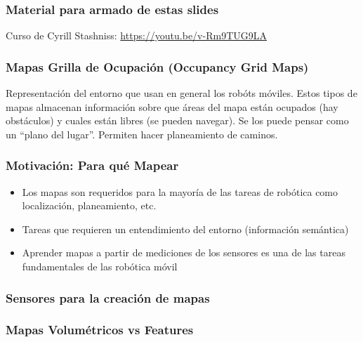 \begin{frame}
	\frametitle{Material para armado de estas slides}
	Curso de Cyrill Stashniss: \url{https://youtu.be/v-Rm9TUG9LA}

\end{frame}

\begin{frame}
    \frametitle{Mapas Grilla de Ocupación (Occupancy Grid Maps)}
    
    Representación del entorno que usan en general los robóts móviles.
    Estos tipos de mapas almacenan información sobre que áreas del mapa están ocupados (hay obstáculos) y cuales están libres (se pueden navegar). Se los puede pensar como un ``plano del lugar''.
    Permiten hacer planeamiento de caminos.
    
    
\end{frame}

\begin{frame}
    \frametitle{Motivación: Para qué Mapear}
    
    \begin{itemize}
        \item Los mapas son requeridos para la mayoría de las tareas de robótica como localización, planeamiento, etc.
        \item Tareas que requieren un entendimiento del entorno (información semántica)
        \item Aprender mapas a partir de mediciones de los sensores es una de las tareas fundamentales de las robótica móvil
    \end{itemize}
    
\end{frame}

\begin{frame}
    \frametitle{Sensores para la creación de mapas}
    
    
\end{frame}

\begin{frame}
    \frametitle{Mapas Volumétricos vs Features}
    
    
\end{frame}


